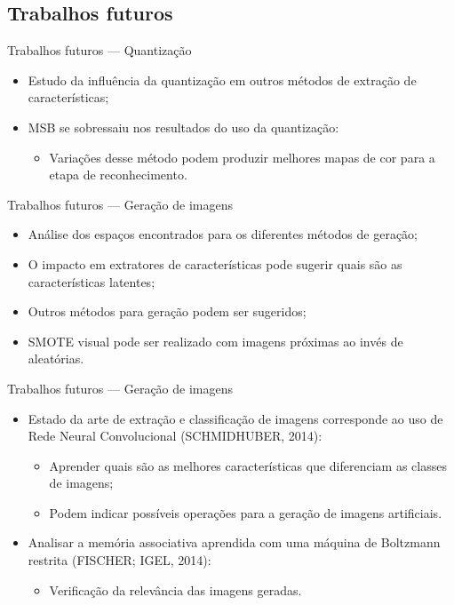 \documentclass{beamer}
\begin{document}
\subsection{Trabalhos futuros}
\begin{frame}{Trabalhos futuros --- Quantização}
  \setlength\leftmargini{1em}
  \justifying
  \begin{itemize}
    \item Estudo da influência da quantização em outros métodos de extração de características;
    \item MSB se sobressaiu nos resultados do uso da quantização:
    \begin{itemize}
      \item Variações desse método podem produzir melhores mapas de cor para a etapa de reconhecimento.
    \end{itemize}
  \end{itemize}
\end{frame}
\begin{frame}{Trabalhos futuros --- Geração de imagens}
  \setlength\leftmargini{1em}
  \justifying
  \begin{itemize}
  \item Análise dos espaços encontrados para os diferentes métodos de geração;
  \item O impacto em extratores de características pode sugerir quais são as características latentes;
  \item Outros métodos para geração podem ser sugeridos;
  \item SMOTE visual pode ser realizado com imagens próximas ao invés de aleatórias.
 \end{itemize}
\end{frame}
\begin{frame}{Trabalhos futuros --- Geração de imagens}
  \setlength\leftmargini{1em}
  \justifying
  \begin{itemize}
  \item Estado da arte de extração e classificação de imagens corresponde ao uso de Rede Neural Convolucional (SCHMIDHUBER, 2014):
    \begin{itemize}
    \item Aprender quais são as melhores características que diferenciam as classes de imagens;
    \item Podem indicar possíveis operações para a geração de imagens artificiais.
    \end{itemize}
  \item Analisar a memória associativa aprendida com uma máquina de Boltzmann restrita (FISCHER; IGEL, 2014):
    \begin{itemize}
    \item Verificação da relevância das imagens geradas.
    \end{itemize}
  \end{itemize}
\end{frame}
\end{document}
